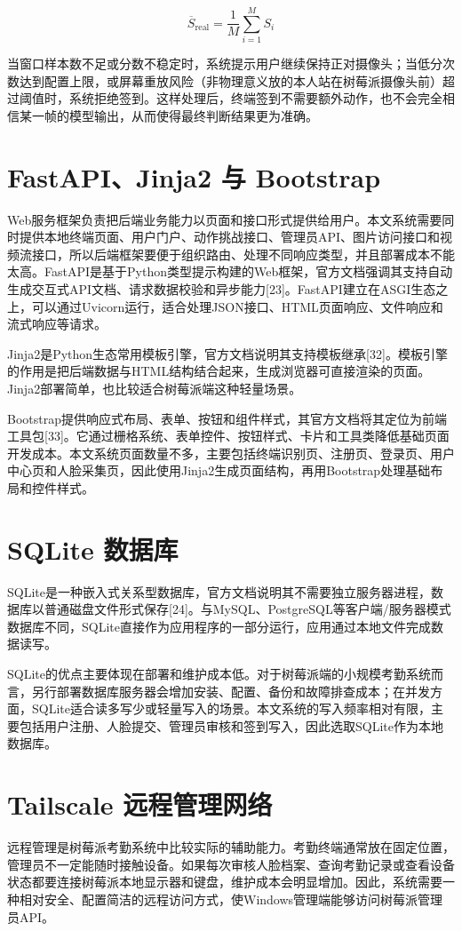 \documentclass[UTF8]{heuthesis}
\begin{document}
\begin{equation*}
\overline{S}_{\mathrm{real}}=\frac{1}{M}\sum_{i=1}^{M}S_i\tag{2.5}
\end{equation*}

当窗口样本数不足或分数不稳定时，系统提示用户继续保持正对摄像头；当低分次数达到配置上限，或屏幕重放风险（非物理意义放的本人站在树莓派摄像头前）超过阈值时，系统拒绝签到。这样处理后，终端签到不需要额外动作，也不会完全相信某一帧的模型输出，从而使得最终判断结果更为准确。

\section{FastAPI、Jinja2 与 Bootstrap}
Web服务框架负责把后端业务能力以页面和接口形式提供给用户。本文系统需要同时提供本地终端页面、用户门户、动作挑战接口、管理员API、图片访问接口和视频流接口，所以后端框架要便于组织路由、处理不同响应类型，并且部署成本不能太高。FastAPI是基于Python类型提示构建的Web框架，官方文档强调其支持自动生成交互式API文档、请求数据校验和异步能力[23]。FastAPI建立在ASGI生态之上，可以通过Uvicorn运行，适合处理JSON接口、HTML页面响应、文件响应和流式响应等请求。

Jinja2是Python生态常用模板引擎，官方文档说明其支持模板继承[32]。模板引擎的作用是把后端数据与HTML结构结合起来，生成浏览器可直接渲染的页面。Jinja2部署简单，也比较适合树莓派端这种轻量场景。
	
Bootstrap提供响应式布局、表单、按钮和组件样式，其官方文档将其定位为前端工具包[33]。它通过栅格系统、表单控件、按钮样式、卡片和工具类降低基础页面开发成本。本文系统页面数量不多，主要包括终端识别页、注册页、登录页、用户中心页和人脸采集页，因此使用Jinja2生成页面结构，再用Bootstrap处理基础布局和控件样式。

\section{SQLite 数据库}
SQLite是一种嵌入式关系型数据库，官方文档说明其不需要独立服务器进程，数据库以普通磁盘文件形式保存[24]。与MySQL、PostgreSQL等客户端/服务器模式数据库不同，SQLite直接作为应用程序的一部分运行，应用通过本地文件完成数据读写。

SQLite的优点主要体现在部署和维护成本低。对于树莓派端的小规模考勤系统而言，另行部署数据库服务器会增加安装、配置、备份和故障排查成本；在并发方面，SQLite适合读多写少或轻量写入的场景。本文系统的写入频率相对有限，主要包括用户注册、人脸提交、管理员审核和签到写入，因此选取SQLite作为本地数据库。

\section{Tailscale 远程管理网络}
远程管理是树莓派考勤系统中比较实际的辅助能力。考勤终端通常放在固定位置，管理员不一定能随时接触设备。如果每次审核人脸档案、查询考勤记录或查看设备状态都要连接树莓派本地显示器和键盘，维护成本会明显增加。因此，系统需要一种相对安全、配置简洁的远程访问方式，使Windows管理端能够访问树莓派管理员API。
\end{document}

